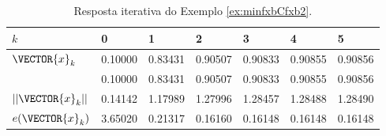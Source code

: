 \begin{table}[h!]
\centering
\begin{tabular}{|l|l|l|l|l|l|l|}
\hline
$k$ & 0 & 1 & 2 & 3 & 4 & 5 \\ \hline
$\VECTOR{x}_k$ & 0.10000   & 0.83431   & 0.90507   & 0.90833   & 0.90855   & 0.90856 \\ 
~              & 0.10000   & 0.83431   & 0.90507   & 0.90833   & 0.90855   & 0.90856 \\ \hline
$||\VECTOR{x}_k||$ & 0.14142   & 1.17989   & 1.27996   & 1.28457   & 1.28488   & 1.28490 \\ \hline
$e(\VECTOR{x}_k)$ & 3.65020  & 0.21317  & 0.16160  & 0.16148  & 0.16148  & 0.16148 \\ \hline
\end{tabular}
\caption{Resposta iterativa do Exemplo \ref{ex:minfxbCfxb2}.}
\label{table:ex:minfxbCfxb2}
\end{table}
